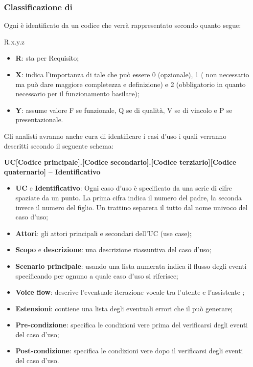 \subsubsection{Classificazione di }
Ogni  è identificato da un codice che verrà rappresentato secondo quanto segue:
\begin{center}
	R.{x}.{y}.{z}
\end{center}
\begin{itemize}
	\item \textbf{R}: sta per Requisito;
	\item \textbf{X}: indica l’importanza di tale  che può essere 0 (opzionale), 1 ( non necessario ma può dare maggiore completezza e definizione) e 2 (obbligatorio in quanto necessario per il funzionamento basilare);
	\item \textbf{Y}: assume valore F se  funzionale, Q se di qualità, V se di vincolo e P se presentazionale.
\end{itemize}
Gli analisti avranno anche cura di identificare i casi d’uso i quali verranno descritti secondo il seguente schema:
\begin{center}
	\textbf{UC[Codice principale].[Codice secondario].[Codice terziario][Codice quaternario] – Identificativo}
\end{center}
\begin{itemize}
	\item \textbf{UC} e \textbf{Identificativo}: Ogni caso d’uso è specificato da una serie di cifre spaziate da un punto. La prima cifra indica il numero del padre, la seconda invece il numero del figlio. Un trattino separera il tutto dal nome univoco del caso d’uso;
	\item \textbf{Attori}: gli attori principali e secondari dell’UC (use case);
	\item \textbf{Scopo} e \textbf{descrizione}: una descrizione riassuntiva del caso d’uso;
	\item \textbf{Scenario principale}: usando una lista numerata indica il flusso degli eventi specificando per ognuno a quale caso d’uso si riferisce;
	\item \textbf{Voice flow}: descrive l'eventuale iterazione vocale tra l'utente e l'assistente ;
	\item \textbf{Estensioni}: contiene una lista degli eventuali errori che il  può generare;
	\item \textbf{Pre-condizione}: specifica le condizioni vere prima del verificarsi degli eventi del caso d’uso;
	\item \textbf{Post-condizione}: specifica le condizioni vere dopo il verificarsi degli eventi del caso d’uso.
\end{itemize}
